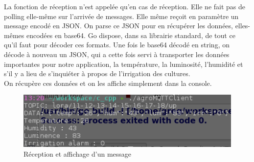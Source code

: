 La fonction de réception n'est appelée qu'en cas de réception. Elle ne fait pas de polling elle-même sur l'arrivée de messages. Elle même reçoit en paramètre un message encodé en JSON. On parse ce JSON pour en récupérer les données, elles-mêmes encodées en base64. Go dispose, dans sa librairie standard, de tout ce qu'il faut pour décoder ces formats. Une fois le base64 décodé en string, on décode à nouveau un JSON, qui a cette fois servi à transporter les données importantes pour notre application, la température, la luminosité, l'humidité et s'il y a lieu de s'inquiéter à propos de l'irrigation des cultures. \\

On récupère ces données et on les affiche simplement dans la console.
\begin{figure}[H]
	\begin{center}
		\includegraphics[width=12cm]{img/app_output.png}
		\caption{Réception et affichage d'un message}
		\label{app_output}
	\end{center}
\end{figure}